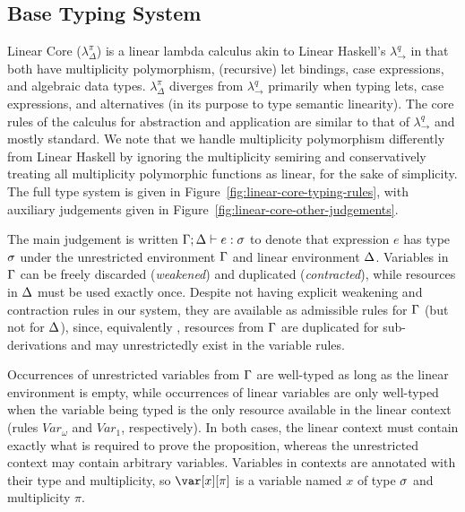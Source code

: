 \documentclass[acmsmall,review,anonymous,screen]{acmart}
\begin{document}
% 

\subsection{Base Typing System\label{sec:base-calculi}}

Linear Core ($\lambda^\pi_\Delta$) is a linear lambda calculus akin to Linear
Haskell's $\lambda^q_\to$ in that both have multiplicity polymorphism,
(recursive) let bindings, case expressions, and algebraic data types.
$\lambda^\pi_\Delta$ diverges from $\lambda^q_\to$ primarily when typing lets,
case expressions, and alternatives (in its purpose to type semantic linearity).
%
%
%
The core rules of the calculus for abstraction and application are similar to
that of $\lambda^q_\to$ and mostly standard. 
We note that we handle multiplicity polymorphism differently from
Linear Haskell by ignoring the multiplicity semiring and
conservatively treating all multiplicity polymorphic functions as
linear, for the sake of simplicity.
%
The full type system is given in Figure~\ref{fig:linear-core-typing-rules},
with auxiliary judgements given in
Figure~\ref{fig:linear-core-other-judgements}.

\TypingRules
\TypingRulesOther

The main judgement is written $\Gamma;\Delta \vdash e : \sigma$ to denote that expression
$e$ has type $\sigma$ under the unrestricted environment $\Gamma$ and linear
environment $\Delta$.
%
%
Variables in $\Gamma$ can be freely discarded (\emph{weakened}) and duplicated
(\emph{contracted}), while resources in $\Delta$ must be used exactly once. Despite
not having explicit weakening and contraction rules in our system, they are
available as admissible rules for $\Gamma$ (but not for $\Delta$), since, equivalently
\cite{91621fae-5e53-3497-8291-32b2fab5a743}, resources from $\Gamma$ are duplicated
for sub-derivations and may unrestrictedly exist in the variable rules.
%

Occurrences of unrestricted variables from $\Gamma$ are well-typed as long as the linear
environment is empty, while occurrences of linear variables are only well-typed
when the variable being typed is the only resource available in the
linear context (rules $Var_\omega$ and $Var_1$, respectively).
In both cases, the linear context must contain exactly what is required to
prove the proposition, whereas the unrestricted context may contain arbitrary
variables.
%
Variables in contexts are annotated with their type and multiplicity, so
$\x[\pi]$ is a variable named $x$ of type $\sigma$ and multiplicity $\pi$.
\end{document}
